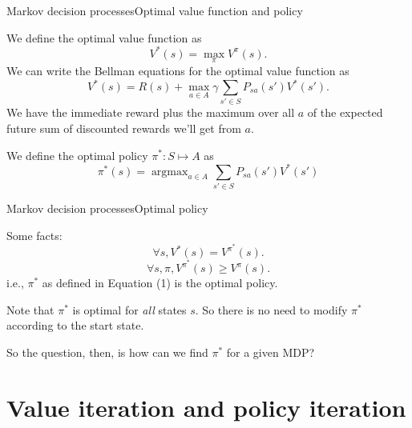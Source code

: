 \documentclass{beamer}
\DeclareMathOperator*{\argmax}{argmax}
\begin{document}
\begin{frame}{Markov decision processes}{Optimal value function and policy}

  We define the \alert{optimal value function} as
  \[ V^*(s) = \max_\pi V^\pi(s) .\]
  We can write the Bellman equations for the optimal value function as
  \[ V^*(s) = R(s) + \max_{a\in A}\gamma\sum_{s'\in S}P_{sa}(s')V^*(s') .\]
  We have the immediate reward plus the maximum over all $a$ of the
  expected future sum of discounted rewards we'll get from $a$.

  \medskip

  We define the \alert{optimal policy} $\pi^* : S \mapsto A$ as
  \begin{equation}
    \label{optpol}
    \pi^*(s) = \argmax_{a \in A} \sum_{s'\in S} P_{sa}(s')V^*(s')
  \end{equation}
  
\end{frame}


\begin{frame}{Markov decision processes}{Optimal policy}

  Some facts:
  \[ \forall s, V^*(s) = V^{\pi^*}(s). \]
  \[ \forall s, \pi, V^{\pi^*}(s) \ge V^\pi(s). \]
  i.e., $\pi^*$ as defined in Equation (1) is the optimal policy.

  \medskip

  Note that $\pi^*$ is optimal for \textit{all} states $s$.
  So there is no need to modify $\pi^*$ according to the start state.

  \medskip

  So the question, then, is \alert{how can we find $\pi^*$ for a given MDP?}
  
\end{frame}

\section{Value iteration and policy iteration}
\end{document}
